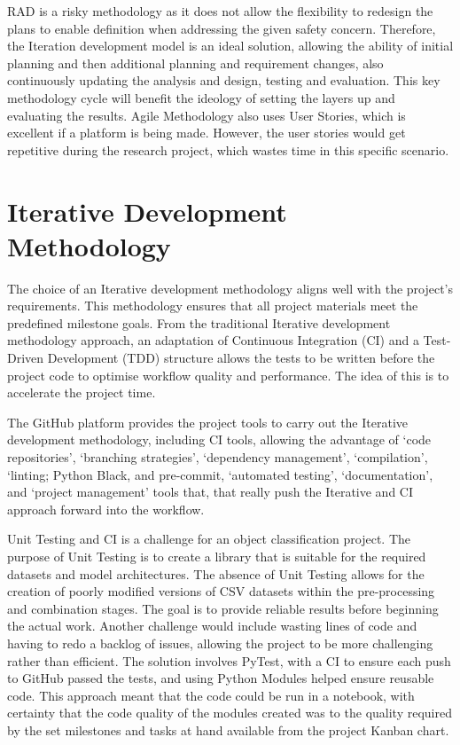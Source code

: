 \documentclass[12pt]{report} %
\begin{document}
	RAD is a risky methodology as it does not allow the flexibility to redesign the plans to enable definition when addressing the given safety concern. Therefore, the Iteration development model is an ideal solution, allowing the ability of initial planning and then additional planning and requirement changes, also continuously updating the analysis and design, testing and evaluation. This key methodology cycle will benefit the ideology of setting the layers up and evaluating the results. Agile Methodology also uses User Stories, which is excellent if a platform is being made. However, the user stories would get repetitive during the research project, which wastes time in this specific scenario.

	\section{Iterative Development Methodology}
		The choice of an Iterative development methodology aligns well with the project's requirements. This methodology ensures that all project materials meet the predefined milestone goals. From the traditional Iterative development methodology approach, an adaptation of Continuous Integration (CI) and a Test-Driven Development (TDD) structure allows the tests to be written before the project code to optimise workflow quality and performance. The idea of this is to accelerate the project time.

		The GitHub platform provides the project tools to carry out the Iterative development methodology, including CI tools, allowing the advantage of `code repositories', `branching strategies', `dependency management', `compilation', `linting; Python Black, and pre-commit, `automated testing', `documentation', and `project management' tools that, that really push the Iterative and CI approach forward into the workflow.

		Unit Testing and CI is a challenge for an object classification project. The purpose of Unit Testing is to create a library that is suitable for the required datasets and model architectures. The absence of Unit Testing allows for the creation of poorly modified versions of CSV datasets within the pre-processing and combination stages. The goal is to provide reliable results before beginning the actual work. Another challenge would include wasting lines of code and having to redo a backlog of issues, allowing the project to be more challenging rather than efficient. The solution involves PyTest, with a CI to ensure each push to GitHub passed the tests, and using Python Modules helped ensure reusable code. This approach meant that the code could be run in a notebook, with certainty that the code quality of the modules created was to the quality required by the set milestones and tasks at hand available from the project Kanban chart. 
		
\end{document}
